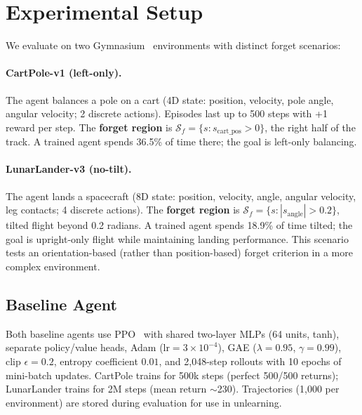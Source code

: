 \documentclass[sigconf]{acmart}
\begin{document}
\section{Experimental Setup}


We evaluate on two Gymnasium~\cite{towers2024gymnasium} environments with distinct forget scenarios:

\paragraph{CartPole-v1 (left-only).} The agent balances a pole on a cart (4D state: position, velocity, pole angle, angular velocity; 2 discrete actions). Episodes last up to 500 steps with +1 reward per step. The \textbf{forget region} is $\mathcal{S}_f = \{s : s_{\text{cart\_pos}} > 0\}$, the right half of the track. A trained agent spends 36.5\% of time there; the goal is left-only balancing.

\paragraph{LunarLander-v3 (no-tilt).} The agent lands a spacecraft (8D state: position, velocity, angle, angular velocity, leg contacts; 4 discrete actions). The \textbf{forget region} is $\mathcal{S}_f = \{s : |s_{\text{angle}}| > 0.2\}$, tilted flight beyond 0.2 radians. A trained agent spends 18.9\% of time tilted; the goal is upright-only flight while maintaining landing performance. This scenario tests an orientation-based (rather than position-based) forget criterion in a more complex environment.

\subsection{Baseline Agent}

Both baseline agents use PPO~\cite{schulman2017proximal} with shared two-layer MLPs (64 units, tanh), separate policy/value heads, Adam ($\text{lr}{=}3{\times}10^{-4}$), GAE ($\lambda{=}0.95$, $\gamma{=}0.99$), clip $\epsilon{=}0.2$, entropy coefficient $0.01$, and 2{,}048-step rollouts with 10 epochs of mini-batch updates. CartPole trains for 500k steps (perfect 500/500 returns); LunarLander trains for 2M steps (mean return ${\sim}$230). Trajectories (1{,}000 per environment) are stored during evaluation for use in unlearning.
\end{document}
